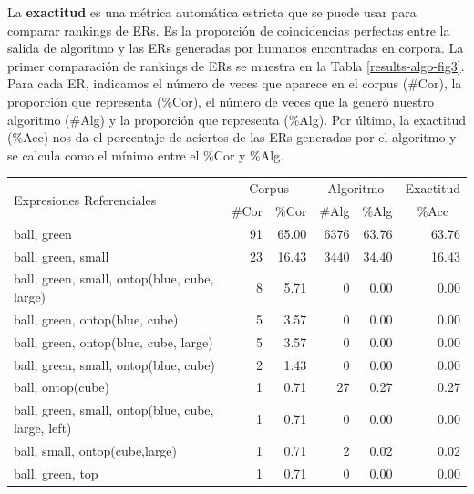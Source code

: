 La \textbf{exactitud}  es una m\'etrica autom\'atica estricta que se puede usar para comparar rankings de ERs. Es la proporci\'on de coincidencias perfectas entre la salida de algoritmo y las ERs generadas por humanos encontradas en corpora. 
La primer comparaci\'on de rankings de ERs se muestra en la Tabla \ref{results-algo-fig3}. Para cada ER, indicamos el n\'umero de veces que aparece en el corpus (\#Cor), la proporci\'on que representa (\%Cor), el n\'umero de veces que la gener\'o nuestro algoritmo (\#Alg) y la proporci\'on que representa (\%Alg).
Por \'ultimo, la exactitud (\%Acc) nos da el porcentaje de aciertos de las ERs generadas por el algoritmo y se calcula como el m\'inimo entre el \%Cor y \%Alg. 

\begin{table}[h]
\begin{small}
\begin{center}
\begin{tabular}{|l|r|r|r|r|r|}
\hline
\multirow{2}{*}{Expresiones Referenciales} & \multicolumn{2}{|c|}{Corpus} & \multicolumn{2}{|c|}{Algoritmo} & Exactitud \\ \cline{2-6} 
 & \#Cor & \multicolumn{1}{|c|}{\%Cor} & \multicolumn{1}{|c|}{\#Alg} & \multicolumn{1}{|c|}{\%Alg} & \multicolumn{1}{|c|}{\%Acc} \\
\hline
ball, green                                    & 91 & 65.00 & 6376 & 63.76 & 63.76 \\
ball, green, small                              & 23 & 16.43 & 3440 & 34.40 & 16.43 \\
ball, green, small, ontop(blue, cube, large)      &  8 &  5.71 &    0 &  0.00 &  0.00\\
ball, green, ontop(blue, cube)                  &  5 &  3.57 &    0 &  0.00 &  0.00\\
ball, green, ontop(blue, cube, large)            &  5 &  3.57 &    0 &  0.00 &  0.00\\
ball, green, small, ontop(blue, cube)            &  2 &  1.43 &    0 &  0.00 &  0.00\\
ball, ontop(cube)                             &  1 &  0.71 &   27 &  0.27 &  0.27 \\
ball, green, small, ontop(blue, cube, large, left) &  1 &  0.71 &    0 &  0.00 &  0.00\\
ball, small, ontop(cube,large)	              &  1 &  0.71 &    2 &  0.02 &  0.02 \\
ball, green, top                                &  1 &  0.71 &    0 &  0.00 &  0.00\\

\end{tabular}
\end{center}
\end{small}
\end{table}
